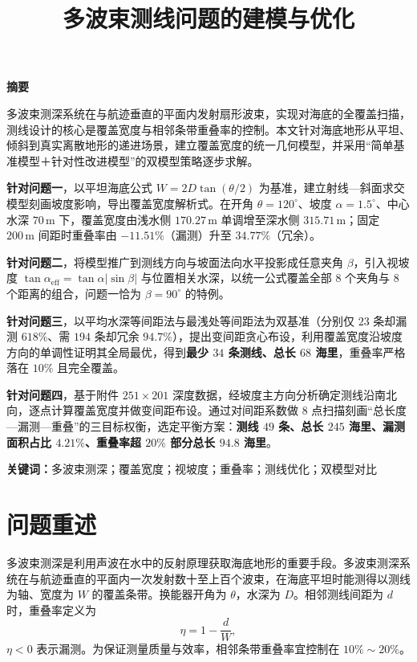 \documentclass[12pt]{ctexart}
\title{\heiti 多波束测线问题的建模与优化}
\author{}
\date{}
\begin{document}
\maketitle
\vspace{-3em}
\begin{center}
\large\bfseries 摘要
\end{center}

多波束测深系统在与航迹垂直的平面内发射扇形波束，实现对海底的全覆盖扫描，测线设计的核心是覆盖宽度与相邻条带重叠率的控制。本文针对海底地形从平坦、倾斜到真实离散地形的递进场景，建立覆盖宽度的统一几何模型，并采用``简单基准模型＋针对性改进模型''的双模型策略逐步求解。

\textbf{针对问题一}，以平坦海底公式 $W=2D\tan(\theta/2)$ 为基准，建立射线—斜面求交模型刻画坡度影响，导出覆盖宽度解析式。在开角 $\theta=120^\circ$、坡度 $\alpha=1.5^\circ$、中心水深 $70\,\mathrm{m}$ 下，覆盖宽度由浅水侧 $170.27\,\mathrm{m}$ 单调增至深水侧 $315.71\,\mathrm{m}$；固定 $200\,\mathrm{m}$ 间距时重叠率由 $-11.51\%$（漏测）升至 $34.77\%$（冗余）。

\textbf{针对问题二}，将模型推广到测线方向与坡面法向水平投影成任意夹角 $\beta$，引入视坡度 $\tan\alpha_{\mathrm{eff}}=\tan\alpha|\sin\beta|$ 与位置相关水深，以统一公式覆盖全部 $8$ 个夹角与 $8$ 个距离的组合，问题一恰为 $\beta=90^\circ$ 的特例。

\textbf{针对问题三}，以平均水深等间距法与最浅处等间距法为双基准（分别仅 $23$ 条却漏测 $618\%$、需 $194$ 条却冗余 $94.7\%$），提出变间距贪心布设，利用覆盖宽度沿坡度方向的单调性证明其全局最优，得到\textbf{最少 $34$ 条测线、总长 $68$ 海里}，重叠率严格落在 $10\%$ 且完全覆盖。

\textbf{针对问题四}，基于附件 $251\times201$ 深度数据，经坡度主方向分析确定测线沿南北向，逐点计算覆盖宽度并做变间距布设。通过对间距系数做 $8$ 点扫描刻画``总长度—漏测—重叠''的三目标权衡，选定平衡方案：\textbf{测线 $49$ 条、总长 $245$ 海里、漏测面积占比 $4.21\%$、重叠率超 $20\%$ 部分总长 $94.8$ 海里}。

\medskip
\noindent\textbf{关键词：}多波束测深；覆盖宽度；视坡度；重叠率；测线优化；双模型对比

\newpage
\section{问题重述}

多波束测深是利用声波在水中的反射原理获取海底地形的重要手段\cite{li,zhao}。多波束测深系统在与航迹垂直的平面内一次发射数十至上百个波束，在海底平坦时能测得以测线为轴、宽度为 $W$ 的覆盖条带。换能器开角为 $\theta$，水深为 $D$。相邻测线间距为 $d$ 时，重叠率定义为
\begin{equation}
\eta=1-\frac{d}{W},
\end{equation}
$\eta<0$ 表示漏测。为保证测量质量与效率，相邻条带重叠率宜控制在 $10\%\sim20\%$。
\end{document}
